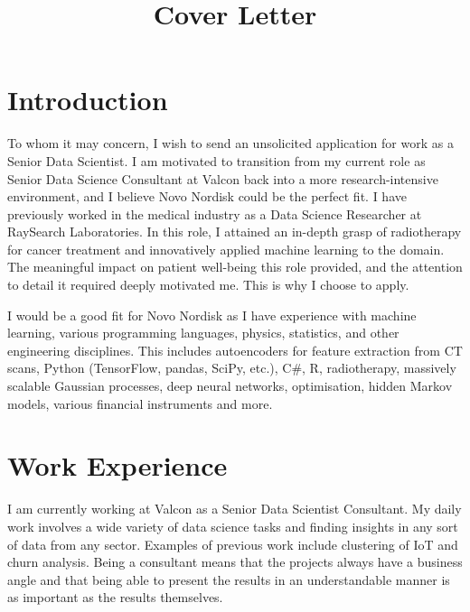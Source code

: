 
\title{Cover Letter}



\newcommand{\role}{Senior Data Scientist}
\newcommand{\company}{Novo Nordisk}


\makecvtitle


\section{Introduction}
To whom it may concern, I wish to send an unsolicited application for work as a Senior Data Scientist. I am motivated to transition from my current role as Senior Data Science Consultant at Valcon back into a more research-intensive environment, and I believe \company{} could be the perfect fit. I have previously worked in the medical industry as a Data Science Researcher at RaySearch Laboratories. In this role, I attained an in-depth grasp of radiotherapy for cancer treatment and innovatively applied machine learning to the domain. The meaningful impact on patient well-being this role provided, and the attention to detail it required deeply motivated me. This is why I choose to apply.


\hspace{7 mm} I would be a good fit for \company{} as I have experience with machine learning, various programming languages, physics, statistics, and other engineering disciplines. This includes autoencoders for feature extraction from CT scans, Python (TensorFlow, pandas, SciPy, etc.), C\#, R, radiotherapy, massively scalable Gaussian processes, deep neural networks, optimisation, hidden Markov models, various financial instruments and more.

\section{Work Experience}
I am currently working at Valcon as a Senior Data Scientist Consultant. My daily work involves a wide variety of data science tasks and finding insights in any sort of data from any sector. Examples of previous work include clustering of IoT and churn analysis. Being a consultant means that the projects always have a business angle and that being able to present the results in an understandable manner is as important as the results themselves.

